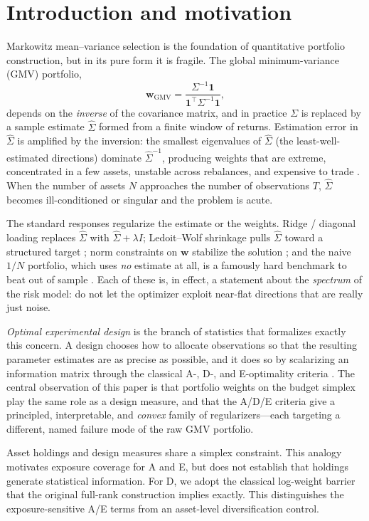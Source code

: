 \documentclass[11pt]{article}
\newcommand{\Sig}{\Sigma}
\newcommand{\Sighat}{\hat\Sigma}
\newcommand{\one}{\mathbf{1}}
\newcommand{\w}{\mathbf{w}}
\begin{document}
\section{Introduction and motivation}
Markowitz mean--variance selection \cite{markowitz1952} is the foundation of
quantitative portfolio construction, but in its pure form it is fragile. The
global minimum-variance (GMV) portfolio, 
\[
  \w_{\mathrm{GMV}}=\frac{\Sig^{-1}\one}{\one^\top\Sig^{-1}\one},
\]
depends on the \emph{inverse} of the covariance matrix, and in practice $\Sig$ is
replaced by a sample estimate $\Sighat$ formed from a finite window of returns.
Estimation error in $\Sighat$ is amplified by the inversion: the smallest
eigenvalues of $\Sighat$ (the least-well-estimated directions) dominate
$\Sighat^{-1}$, producing weights that are extreme, concentrated in a few
assets, unstable across rebalances, and expensive to trade
\cite{brittenjones1999}. When the number of assets $N$ approaches the number of
observations $T$, $\Sighat$ becomes ill-conditioned or singular and the problem
is acute.

The standard responses regularize the estimate or the weights. Ridge / diagonal
loading replaces $\Sighat$ with $\Sighat+\lambda I$; Ledoit--Wolf shrinkage
pulls $\Sighat$ toward a structured target \cite{ledoitwolf2004}; norm
constraints on $\w$ stabilize the solution \cite{demiguel2009norm, man17}; and the naive
$1/N$ portfolio, which uses \emph{no} estimate at all, is a famously hard
benchmark to beat out of sample \cite{demiguel2009}. Each of these is, in effect,
a statement about the \emph{spectrum} of the risk model: do not let the optimizer
exploit near-flat directions that are really just noise.

\emph{Optimal experimental design} is the branch of statistics that formalizes
exactly this concern. A design chooses how to allocate observations so that the
resulting parameter estimates are as precise as possible, and it does so by
scalarizing an information matrix through the classical A-, D-, and E-optimality
criteria \cite{atk07, fed72, bergerwong, pukelsheim2006}. The central observation of this paper
is that portfolio weights on the budget simplex play the same role as a design
measure, and that the A/D/E criteria give a principled, interpretable, and
\emph{convex} family of regularizers---each targeting a different, named failure
mode of the raw GMV portfolio.

Asset holdings and design measures share a simplex constraint. This analogy motivates exposure coverage for A and E, but does not establish that holdings generate statistical information. For D, we adopt the classical log-weight barrier that the original full-rank construction implies exactly. This distinguishes the exposure-sensitive A/E terms from an asset-level diversification control.
\end{document}
